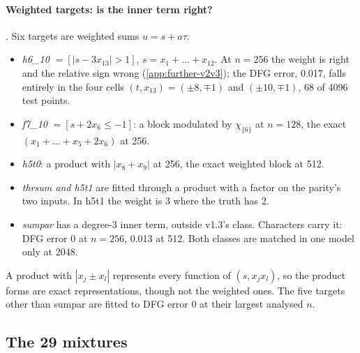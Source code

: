 \paragraph{Weighted targets: is the inner term right?} . Six targets are weighted sums $u=s+a\tau$.
\begin{itemize}
\item \emph{h6\_10} $=[|s-3x_{13}|>1]$, $s=x_1+\dots+x_{12}$. At $n=256$ the weight is right and the relative sign wrong (\cref{app:further-v2v3}); the DFG error, 0.017, falls entirely in the four cells $(t,x_{13})=(\pm8,\mp1)$ and $(\pm10,\mp1)$, 68 of 4096 test points.
\item \emph{f7\_10} $=[s+2x_6\le-1]$: a block modulated by $\chi_{\{6\}}$ at $n=128$, the exact $(x_1+\dots+x_5+2x_6)$ at 256.
\item \emph{h5t0}: a product with $|x_8+x_9|$ at 256, the exact weighted block at 512.
\item \emph{thrsum and h5t1} are fitted through a product with a factor on the parity's two inputs. In h5t1 the weight is 3 where the truth has 2.
\item \emph{sumpar} has a degree-3 inner term, outside v1.3's class. Characters carry it: DFG error 0 at $n=256$, 0.013 at 512. Both classes are matched in one model only at 2048.
\end{itemize}
A product with $|x_j\pm x_l|$ represents every function of $(s,x_jx_l)$, so the product forms are exact representations, though not the weighted ones. The five targets other than sumpar are fitted to DFG error 0 at their largest analysed $n$.

\subsection{The 29 mixtures}\label{app:interp-mixtures}

